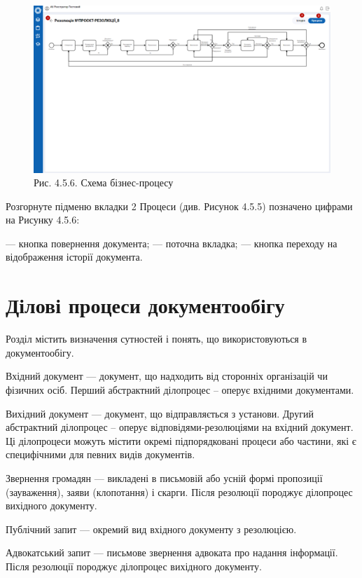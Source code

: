\begin{figure}[!htbp]
\centerline{\includegraphics[width=\textwidth]{img/4.5.6.png}}
\caption{Рис. 4.5.6. Схема бізнес-процесу}
\end{figure}

Розгорнуте підменю вкладки 2 Процеси (див. Рисунок 4.5.5) позначено цифрами на Рисунку 4.5.6:

 --- кнопка повернення документа;
 --- поточна вкладка;
 --- кнопка переходу на відображення історії документа.

\chapter{Ділові процеси документообігу}

Розділ містить визначення сутностей і понять, що використовуються в
документообігу.

Вхідний документ — документ, що надходить від сторонніх організацій чи
фізичних осіб. Перший абстрактний ділопроцес – оперує вхідними документами.

Вихідний документ — документ, що відправляється з установи. Другий
абстрактний ділопроцес – оперує відповідями-резолюціями на вхідний документ.
Ці ділопроцеси можуть містити окремі підпорядковані процеси або частини, які є
специфічними для певних видів документів.

Звернення громадян — викладені в письмовій або усній формі пропозиції
(зауваження), заяви (клопотання) і скарги. Після резолюції породжує ділопроцес
вихідного документу.

Публічний запит — окремий вид вхідного документу з резолюцією.

Адвокатський запит — письмове звернення адвоката про надання інформації.
Після резолюції породжує ділопроцес вихідного документу.

